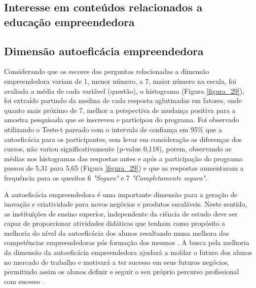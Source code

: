 \subsection{Interesse em conteúdos relacionados a educação empreendedora}


\subsection{Dimensão autoeficácia empreendedora}

Considerando que os escores das perguntas relacionadas a dimensão empreendedora variam de 1, menor número, a 7, maior número na escala, foi avaliada a média de cada variável (questão),
o histograma (Figura \ref{figura_29}), foi extraído partindo da medina de cada resposta aglutinadas em fatores, onde quanto mais próximo de 7, melhor a perspectiva de mudança positiva para a amostra pesquisada que se inscreveu e participou do programa. Foi observado utilizando o Teste-t pareado com o intervalo de confiança em 95\%  que a autoeficácia para os participantes, sem levar em consideração as diferenças dos cursos, não variou significativamente (p-value 0,118), porem, observando as médias nos histogramas das respostas antes e após a participação do programa passou de 5,31 para 5,65 (Figura \ref{figura_29}) e que as respostas aumentaram a frequência para os quesitos 6 \textit{"Seguro"} e 7 \textit{"Completamente seguro"}.

A autoeficácia empreendedora é uma importante dimensão para a geração de inovação e criatividade para novos negócios e produtos escaláveis. Neste sentido, as instituições de ensino superior, independente da ciência de estudo deve ser capaz de proporcionar atividades didáticas que tenham como propósito a melhoria do nível da autoeficácia dos alunos resultando numa melhora das competências empreendedoras  pós formação dos mesmos \cite{ribeiro_autoeficacia_2019}. A busca pela melhoria da dimensão da autoeficácia empreendedora ajudará a moldar o futuro dos alunos no mercado de trabalho e motivará a ter sucesso em seus futuros negócios, permitindo assim os alunos  definir e seguir o seu próprio percurso profissional com sucesso  \cite{das_examining_2018}.


